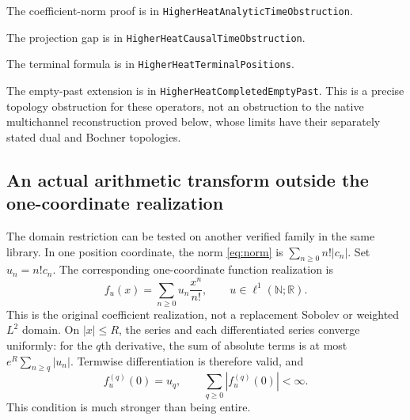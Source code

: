 \documentclass[11pt]{article}
\theoremstyle{remark}\newtheorem{remark}[theorem]{Remark}
\newcommand{\R}{\mathbb R}\newcommand{\N}{\mathbb N}
\newcommand{\code}[1]{{\small\nolinkurl{#1}}}
\begin{document}
\par\noindent
The coefficient-norm proof is in \code{HigherHeatAnalyticTimeObstruction}.

\noindent The projection gap is in \code{HigherHeatCausalTimeObstruction}.

\noindent The terminal formula is in \code{HigherHeatTerminalPositions}.

\noindent The empty-past extension is in \code{HigherHeatCompletedEmptyPast}.
This is a precise topology obstruction for these operators, not an
obstruction to the native multichannel reconstruction proved below,
whose limits have their separately stated dual and Bochner topologies.

\subsection*{An actual arithmetic transform outside the one-coordinate realization}
The domain restriction can be tested on another verified family in the
same library. In one position coordinate, the norm
\eqref{eq:norm} is $\sum_{n\geq0}n!|c_n|$. Set $u_n=n!c_n$.
The corresponding one-coordinate function realization is
\begin{equation}\label{eq:factorialrealization}
 f_u(x)=\sum_{n\geq0}u_n\frac{x^n}{n!},\qquad
 u\in\ell^1(\N;\R).
\end{equation}
This is the original coefficient realization, not a replacement
Sobolev or weighted $L^2$ domain. On $|x|\leq R$, the series
and each differentiated series converge uniformly: for the $q$th
derivative, the sum of absolute terms is at most
$e^R\sum_{n\geq q}|u_n|$. Termwise differentiation is therefore
valid, and
\[
 f_u^{(q)}(0)=u_q,\qquad
 \sum_{q\geq0}|f_u^{(q)}(0)|<\infty.
\]
This condition is much stronger than being entire.
\end{document}
